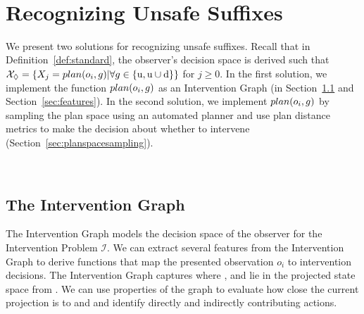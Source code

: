 ~\section{Recognizing Unsafe Suffixes}
\label{sec:recognizing-unsafe-suffixes}
We present two solutions for recognizing unsafe suffixes. 
Recall that in Definition~\ref{def:standard}, the observer's decision space \Suffixes is derived such that $\mathcal{X}_\Diamond = \{ X_j = plan( o_i, g) | \forall g \in \{\mathrm{u}, \mathrm{u}\cup\mathrm{d}\} \}$ for $j \geq 0$. 
In the first solution, we implement the function $plan( o_i, g)$ as an Intervention Graph (in Section~\ref{sec:intervention-graph}
and Section~\ref{sec:features}). 
In the second solution, we implement $plan( o_i, g)$ by sampling the plan space using an automated planner and use plan distance metrics to make the decision about whether to intervene (Section~\ref{sec:planspacesampling}).


~\subsection{The Intervention Graph}
\label{sec:intervention-graph}

The Intervention Graph models the decision space of the observer for the Intervention Problem $\mathcal{I}$.
We can extract several features from the Intervention Graph to derive functions that map the presented observation $o_i$ to intervention decisions. 
The Intervention Graph captures where \undesired, and \dandu lie in the projected state space from \historyEndState. 
We can use properties of the graph to evaluate how close the current projection \historyDef is to \undesired and \dandu and identify directly and indirectly contributing actions.

